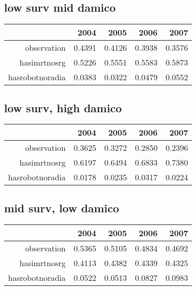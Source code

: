 \documentclass[12pt]{report}
\begin{document}
\subsection{low surv mid damico}
\begin{table}[ht]
\begin{center}
\begin{tabular}{rrrrr}
  \hline
 & 2004 & 2005 & 2006 & 2007 \\ 
  \hline
observation & 0.4391 & 0.4126 & 0.3938 & 0.3576 \\ 
  hasimrtnosrg & 0.5226 & 0.5551 & 0.5583 & 0.5873 \\ 
  hasrobotnoradia & 0.0383 & 0.0322 & 0.0479 & 0.0552 \\ 
   \hline
\end{tabular}
\end{center}
\end{table}
\subsection{low surv, high damico}
\begin{table}[ht]
\begin{center}
\begin{tabular}{rrrrr}
  \hline
 & 2004 & 2005 & 2006 & 2007 \\ 
  \hline
observation & 0.3625 & 0.3272 & 0.2850 & 0.2396 \\ 
  hasimrtnosrg & 0.6197 & 0.6494 & 0.6833 & 0.7380 \\ 
  hasrobotnoradia & 0.0178 & 0.0235 & 0.0317 & 0.0224 \\ 
   \hline
\end{tabular}
\end{center}
\end{table}
\pagebreak
\subsection{mid surv, low damico}
\begin{table}[ht]
\begin{center}
\begin{tabular}{rrrrr}
  \hline
 & 2004 & 2005 & 2006 & 2007 \\ 
  \hline
observation & 0.5365 & 0.5105 & 0.4834 & 0.4692 \\ 
  hasimrtnosrg & 0.4113 & 0.4382 & 0.4339 & 0.4325 \\ 
  hasrobotnoradia & 0.0522 & 0.0513 & 0.0827 & 0.0983 \\ 
   \hline
\end{tabular}
\end{center}
\end{table}
\end{document}
